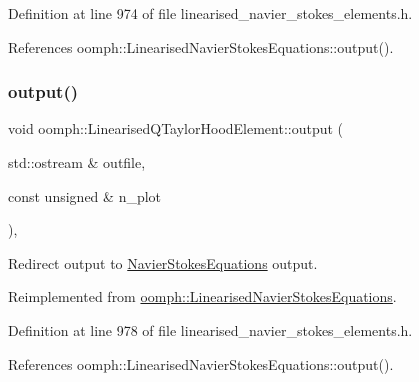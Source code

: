 Definition at line 974 of file linearised\+\_\+navier\+\_\+stokes\+\_\+elements.\+h.



References oomph\+::\+Linearised\+Navier\+Stokes\+Equations\+::output().

\mbox{\label{classoomph_1_1LinearisedQTaylorHoodElement_a323f84cf9d6e3fc85e96e6e0a0f23ada}} 
\subsubsection{\texorpdfstring{output()}{output()}\hspace{0.1cm}{\footnotesize\ttfamily [2/4]}}
{\footnotesize\ttfamily void oomph\+::\+Linearised\+Q\+Taylor\+Hood\+Element\+::output (\begin{DoxyParamCaption}\item[{std\+::ostream \&}]{outfile,  }\item[{const unsigned \&}]{n\+\_\+plot }\end{DoxyParamCaption})\hspace{0.3cm}{\ttfamily [inline]}, {\ttfamily [virtual]}}



Redirect output to \hyperlink{classoomph_1_1NavierStokesEquations}{Navier\+Stokes\+Equations} output. 



Reimplemented from \hyperlink{classoomph_1_1LinearisedNavierStokesEquations_a66bb65cc2c52846e76f8d02c1f956215}{oomph\+::\+Linearised\+Navier\+Stokes\+Equations}.



Definition at line 978 of file linearised\+\_\+navier\+\_\+stokes\+\_\+elements.\+h.



References oomph\+::\+Linearised\+Navier\+Stokes\+Equations\+::output().

\mbox{\label{classoomph_1_1LinearisedQTaylorHoodElement_a93a43aa55672d50f4fde9b0f088c95ab}} 
